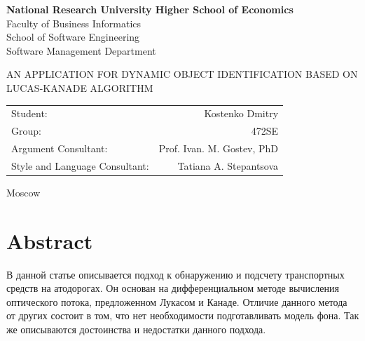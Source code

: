 \documentclass[12pt,a4paper,oneside,titlepage]{article}
\author{Kostenko}
\begin{document}
{
\thispagestyle{empty}
\newpage
\centering

\textbf{
National Research University Higher School of Economics\\
}
Faculty of Business Informatics\\
School of Software Engineering\\
Software Management Department

\vfill


\begin{large}
\MakeTextUppercase{
An Application for Dynamic Object Identification Based on Lucas-Kanade Algorithm
}
\end{large}


\vfill

\begin{tabular}{lr}
Student: & Kostenko Dmitry \\
Group: & 472SE \\
Argument Consultant: & Prof. Ivan. M. Gostev, PhD \\
Style and Language Consultant: & Tatiana A. Stepantsova
\end{tabular}

\vspace{\fill}

Moscow\\ \number\year
\clearpage
}

\section*{Abstract}
{
В данной статье описывается подход к обнаружению и подсчету транспортных средств на атодорогах.
Он основан на дифференциальном методе вычисления оптического потока, предложенном Лукасом и Канаде.
Отличие данного метода от других состоит в том, что нет необходимости подготавливать модель фона.
Так же описываются достоинства и недостатки данного подхода.
}









{
\newpage
\centering
\tableofcontents
}











\newpage
\end{document}
